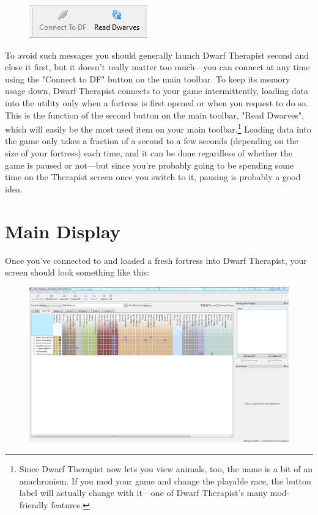 \documentclass[]{article}
\begin{document}
\begin{figure}
\vspace{-20pt}
  \begin{center}
    \includegraphics[scale=.95]{Sec1Fig3}
  \end{center}
  \vspace{-10pt}
  \end{figure}
To avoid such messages you should generally launch Dwarf Therapist second and close it first, but it
doesn't really matter too much---you can connect at any time using the "Connect to DF" button on the
main toolbar. To keep its memory usage down, Dwarf Therapist connects to your game intermittently, loading
data into the utility only when a fortress is first opened or when you request to do so. This is the
function of the second button on the main toolbar, "Read Dwarves", which will easily be the most used
item on your main toolbar.\footnote{Since Dwarf Therapist now lets you view animals, too, the name is a
bit of an anachronism. If you mod your game and change the playable race, the button label will actually
change with it---one of Dwarf Therapist's many mod-friendly features.} Loading data into the game only
takes a fraction of a second to a few seconds (depending on the size of your fortress) each time, and it
can be done regardless of whether the game is paused or not---but since you're probably going to be
spending some time on the Therapist screen once you switch to it, pausing is probably a good idea.
\newpage

\section{Main Display}
\label{sec:Main Display}
Once you've connected to and loaded a fresh fortress into Dwarf Therapist, your screen should look
something like this:
\begin{figure}[h!] \centering \includegraphics[width=\linewidth]{Sec1Fig4}
\end{figure}
\end{document}
